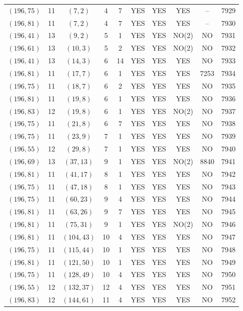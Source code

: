 \begin{longtable}{|c|c|c|c|c|c|c|c|c|c|}
$(196, 75)$ & 11 & $(7, 2)$ & 4 & 7 & YES & YES & YES & -- & 7929\\
$(196, 81)$ & 11 & $(7, 2)$ & 4 & 7 & YES & YES & YES & -- & 7930\\
$(196, 41)$ & 13 & $(9, 2)$ & 5 & 1 & YES & YES & NO(2) & NO & 7931\\
$(196, 61)$ & 13 & $(10, 3)$ & 5 & 2 & YES & YES & NO(2) & NO & 7932\\
$(196, 41)$ & 13 & $(14, 3)$ & 6 & 14 & YES & YES & YES & NO & 7933\\
$(196, 81)$ & 11 & $(17, 7)$ & 6 & 1 & YES & YES & YES & 7253 & 7934\\
$(196, 75)$ & 11 & $(18, 7)$ & 6 & 2 & YES & YES & YES & NO & 7935\\
$(196, 81)$ & 11 & $(19, 8)$ & 6 & 1 & YES & YES & YES & NO & 7936\\
$(196, 83)$ & 12 & $(19, 8)$ & 6 & 1 & YES & YES & NO(2) & NO & 7937\\
$(196, 75)$ & 11 & $(21, 8)$ & 6 & 7 & YES & YES & YES & NO & 7938\\
$(196, 75)$ & 11 & $(23, 9)$ & 7 & 1 & YES & YES & YES & NO & 7939\\
$(196, 55)$ & 12 & $(29, 8)$ & 7 & 1 & YES & YES & YES & NO & 7940\\
$(196, 69)$ & 13 & $(37, 13)$ & 9 & 1 & YES & YES & NO(2) & 8840 & 7941\\
$(196, 81)$ & 11 & $(41, 17)$ & 8 & 1 & YES & YES & YES & NO & 7942\\
$(196, 75)$ & 11 & $(47, 18)$ & 8 & 1 & YES & YES & YES & NO & 7943\\
$(196, 75)$ & 11 & $(60, 23)$ & 9 & 4 & YES & YES & YES & NO & 7944\\
$(196, 81)$ & 11 & $(63, 26)$ & 9 & 7 & YES & YES & YES & NO & 7945\\
$(196, 81)$ & 11 & $(75, 31)$ & 9 & 1 & YES & YES & NO(2) & NO & 7946\\
$(196, 81)$ & 11 & $(104, 43)$ & 10 & 4 & YES & YES & YES & NO & 7947\\
$(196, 75)$ & 11 & $(115, 44)$ & 10 & 1 & YES & YES & YES & NO & 7948\\
$(196, 81)$ & 11 & $(121, 50)$ & 10 & 1 & YES & YES & YES & NO & 7949\\
$(196, 75)$ & 11 & $(128, 49)$ & 10 & 4 & YES & YES & YES & NO & 7950\\
$(196, 55)$ & 12 & $(132, 37)$ & 12 & 4 & YES & YES & YES & NO & 7951\\
$(196, 83)$ & 12 & $(144, 61)$ & 11 & 4 & YES & YES & YES & NO & 7952\\

\end{longtable}
